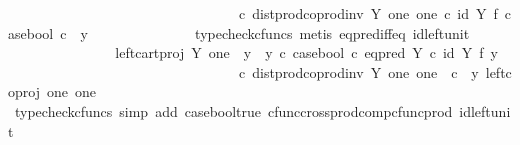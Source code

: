 \begin{isabellebody}
\ \ \ \ \ \ \ \ \ \ \ \ \ \ \ \ \ \ \ \ \ \ \ \ \ \ \ \ \ \ \ \ \ {\isasymcirc}\isactrlsub c\ dist{\isacharunderscore}{\kern0pt}prod{\isacharunderscore}{\kern0pt}coprod{\isacharunderscore}{\kern0pt}inv\ Y\ one\ one\ {\isasymcirc}\isactrlsub c\ {\isacharparenleft}{\kern0pt}id\ Y\ {\isasymtimes}\isactrlsub f\ case{\isacharunderscore}{\kern0pt}bool{\isacharparenright}{\kern0pt}\ {\isasymcirc}\isactrlsub c\ \ {\isasymlangle}y{\isacharcomma}{\kern0pt}\ {\isasymt}{\isasymrangle}{\isachardoublequoteclose}\isanewline
\ \ \ \ \ \ \ \ \ \ \ \ \isamarkupfalse%
\ {\isacharparenleft}{\kern0pt}typecheck{\isacharunderscore}{\kern0pt}cfuncs{\isacharcomma}{\kern0pt}\ metis\ eq{\isacharunderscore}{\kern0pt}pred{\isacharunderscore}{\kern0pt}iff{\isacharunderscore}{\kern0pt}eq\ id{\isacharunderscore}{\kern0pt}left{\isacharunderscore}{\kern0pt}unit{}{\isacharparenright}{\kern0pt}\isanewline
\ \ \ \ \ \ \ \ \ \ \isamarkupfalse%
\ \isamarkupfalse%
\ {\isachardoublequoteopen}{\isachardot}{\kern0pt}{\isachardot}{\kern0pt}{\isachardot}{\kern0pt}\ {\isacharequal}{\kern0pt}\ {\isacharparenleft}{\kern0pt}left{\isacharunderscore}{\kern0pt}cart{\isacharunderscore}{\kern0pt}proj\ Y\ one\ {\isasymamalg}\ {\isacharparenleft}{\kern0pt}{\isacharparenleft}{\kern0pt}y{}\ {\isasymamalg}\ y{}{\isacharparenright}{\kern0pt}\ {\isasymcirc}\isactrlsub c\ case{\isacharunderscore}{\kern0pt}bool\ {\isasymcirc}\isactrlsub c\ eq{\isacharunderscore}{\kern0pt}pred\ Y\ {\isasymcirc}\isactrlsub c\ {\isacharparenleft}{\kern0pt}id\ Y\ {\isasymtimes}\isactrlsub f\ y{}{\isacharparenright}{\kern0pt}{\isacharparenright}{\kern0pt}{\isacharparenright}{\kern0pt}\ \isanewline
\ \ \ \ \ \ \ \ \ \ \ \ \ \ \ \ \ \ \ \ \ \ \ \ \ \ \ \ \ \ \ \ \ {\isasymcirc}\isactrlsub c\ dist{\isacharunderscore}{\kern0pt}prod{\isacharunderscore}{\kern0pt}coprod{\isacharunderscore}{\kern0pt}inv\ Y\ one\ one\ \ {\isasymcirc}\isactrlsub c\ \ {\isasymlangle}y{\isacharcomma}{\kern0pt}\ left{\isacharunderscore}{\kern0pt}coproj\ one\ one{\isasymrangle}{\isachardoublequoteclose}\isanewline
\ \ \ \ \ \ \ \ \ \ \ \ \isamarkupfalse%
\ {\isacharparenleft}{\kern0pt}typecheck{\isacharunderscore}{\kern0pt}cfuncs{\isacharcomma}{\kern0pt}\ simp\ add{\isacharcolon}{\kern0pt}\ case{\isacharunderscore}{\kern0pt}bool{\isacharunderscore}{\kern0pt}true\ cfunc{\isacharunderscore}{\kern0pt}cross{\isacharunderscore}{\kern0pt}prod{\isacharunderscore}{\kern0pt}comp{\isacharunderscore}{\kern0pt}cfunc{\isacharunderscore}{\kern0pt}prod\ id{\isacharunderscore}{\kern0pt}left{\isacharunderscore}{\kern0pt}unit{}{\isacharparenright}{\kern0pt}\isanewline

\end{isabellebody}
